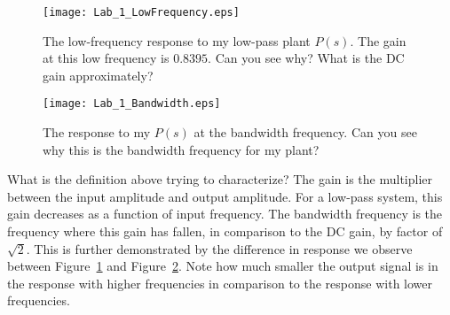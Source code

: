 %
\begin{figure}[H]
  \texttt{[image: Lab\_1\_LowFrequency.eps]}
  \caption[Low Frequency Response of a Low-Pass Plant]{The low-frequency response to my low-pass plant \(P(s).\) The gain
  at this low frequency is \(0.8395.\) Can you see why? What is the DC
  gain approximately?}
  \label{fig:lab1:lowfreq}
\end{figure}
%
\begin{figure}[H]
  \texttt{[image: Lab\_1\_Bandwidth.eps]}
  \caption[Time-Domain Response of a First-Order System at the Bandwidth Frequency]{The response to my \(P(s)\) at the bandwidth frequency.
  Can you see why this is the bandwidth frequency for my plant?}
  \label{fig:lab1:bandwidth}
\end{figure}
%
What is the definition above trying to characterize? The
gain is the multiplier between the input amplitude and output amplitude. For
a low-pass system, this gain decreases as a function of input frequency. The
bandwidth frequency is the frequency where this gain has fallen, in comparison
to the DC gain, by factor of \(\sqrt{2}.\) This is further demonstrated
by the difference in response we observe between Figure~\ref{fig:lab1:lowfreq}
and Figure~\ref{fig:lab1:bandwidth}. Note how much smaller the output signal
is in the response with higher frequencies in comparison to the response
with lower frequencies.
%
